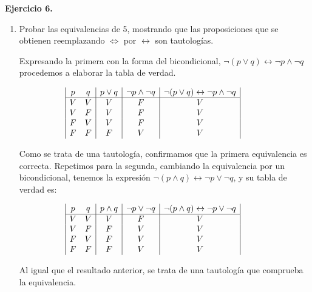 \textbf{Ejercicio 6.}
\begin{enumerate}
	\item Probar las equivalencias de 5, mostrando que las proposiciones que se obtienen reemplazando $\Leftrightarrow$ por $\leftrightarrow$ son
	tautologías.
	
	Expresando la primera con la forma del bicondicional, $\neg(p \vee q) \leftrightarrow \neg p \wedge \neg q$ procedemos a elaborar la tabla de verdad.
	
	\begin{displaymath}
		\hspace*{-1cm}
		\begin{array}{|c c|c|c|c|}
			p & q & p \vee q & \neg p \wedge \neg q & \neg(p \vee q) \leftrightarrow \neg p \wedge \neg q\\
			\hline 
			V & V & V & F & V\\
			V & F & V & F & V\\
			F & V & V & F & V\\
			F & F & F & V & V\\
		\end{array}
	\end{displaymath}
	
	Como se trata de una tautolog\'ia, confirmamos que la primera equivalencia es correcta. Repetimos para la segunda, cambiando la equivalencia por un bicondicional, tenemos la expresi\'on $\neg(p \wedge q) \leftrightarrow \neg p \vee \neg q$, y su tabla de verdad es:
	
	\begin{displaymath}
		\hspace*{-1cm}
		\begin{array}{|c c|c|c|c|}
			p & q & p \wedge q & \neg p \vee \neg q & \neg(p \wedge q) \leftrightarrow \neg p \vee \neg q\\
			\hline 
			V & V & V & F & V\\
			V & F & F & V & V\\
			F & V & F & V & V\\
			F & F & F & V & V\\
		\end{array}
	\end{displaymath}
	
	Al igual que el resultado anterior, se trata de una tautolog\'ia que comprueba la equivalencia.
	
\end{enumerate}
